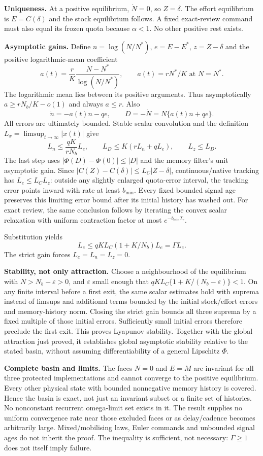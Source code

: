 \documentclass[
  10pt,
  a4paper,
]{article}
\begin{document}
\textbf{Uniqueness.} At a positive equilibrium, \(\dot N=0\), so
\(Z=\delta\). The effort equilibrium is \(E=C(\delta)\) and the stock
equilibrium follows. A fixed exact-review command must also equal its
frozen quota because \(\alpha<1\). No other positive rest exists.

\textbf{Asymptotic gains.} Define \(n=\log(N/N^*)\), \(e=E-E^*\),
\(z=Z-\delta\) and the positive logarithmic-mean coefficient
\[a(t)=\frac rK\frac{N-N^*}{\log(N/N^*)},\qquad a(t)=rN^*/K\text{ at }N=N^*.\]
The logarithmic mean lies between its positive arguments. Thus
asymptotically \(a\ge rN_b/K-o(1)\) and always \(a\le r\). Also
\[\dot n=-a(t)n-qe,\qquad D=-\dot N=N\{a(t)n+qe\}.\] All errors are
ultimately bounded. Stable scalar convolution and the definition
\(L_x=\limsup_{t\to\infty}|x(t)|\) give
\[L_n\le\frac{qK}{rN_b}L_e,\qquad L_D\le K(rL_n+qL_e),\qquad L_z\le L_D.\]
The last step uses \(|\Phi(D)-\Phi(0)|\le|D|\) and the memory filter's
unit asymptotic gain. Since \(|C(Z)-C(\delta)|\le L_C|Z-\delta|\),
continuous/native tracking has \(L_e\le L_CL_z\): outside any slightly
enlarged quota-error interval, the tracking error points inward with
rate at least \(b_{\min}\). Every fixed bounded signal age preserves
this limiting error bound after its initial history has washed out. For
exact review, the same conclusion follows by iterating the convex scalar
relaxation with uniform contraction factor at most \(e^{-b_{\min}T_r}\).

Substitution yields \[L_e\le qKL_C(1+K/N_b)L_e=\Gamma L_e.\] The strict
gain forces \(L_e=L_n=L_z=0\).

\textbf{Stability, not only attraction.} Choose a neighbourhood of the
equilibrium with \(N>N_b-\varepsilon>0\), and \(\varepsilon\) small
enough that \(qKL_C\{1+K/(N_b-\varepsilon)\}<1\). On any finite interval
before a first exit, the same scalar estimates hold with suprema instead
of limsups and additional terms bounded by the initial stock/effort
errors and memory-history norm. Closing the strict gain bounds all three
suprema by a fixed multiple of those initial errors. Sufficiently small
initial errors therefore preclude the first exit. This proves Lyapunov
stability. Together with the global attraction just proved, it
establishes global asymptotic stability relative to the stated basin,
without assuming differentiability of a general Lipschitz \(\Phi\).

\textbf{Complete basin and limits.} The faces \(N=0\) and \(E=M\) are
invariant for all three protected implementations and cannot converge to
the positive equilibrium. Every other physical state with bounded
nonnegative memory history is covered. Hence the basin is exact, not
just an invariant subset or a finite set of histories. No nonconstant
recurrent omega-limit set exists in it. The result supplies no uniform
convergence rate near those excluded faces or as delay/cadence becomes
arbitrarily large. Mixed/mobilising laws, Euler commands and unbounded
signal ages do not inherit the proof. The inequality is sufficient, not
necessary: \(\Gamma\ge1\) does not itself imply failure.
\end{document}
